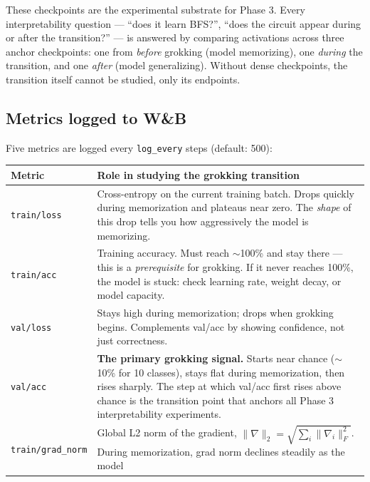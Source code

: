 \documentclass[11pt, a4paper]{article}
\begin{document}
These checkpoints are the experimental substrate for Phase 3. Every
interpretability question --- ``does it learn BFS?'', ``does the circuit appear
during or after the transition?'' --- is answered by comparing activations
across three anchor checkpoints: one from \emph{before} grokking (model
memorizing), one \emph{during} the transition, and one \emph{after} (model
generalizing). Without dense checkpoints, the transition itself cannot be
studied, only its endpoints.

\subsection{Metrics logged to W\&B}

Five metrics are logged every \texttt{log\_every} steps (default: 500):

\begin{table}[H]
\centering
\begin{tabular}{@{}lp{9cm}@{}}
\toprule
Metric & Role in studying the grokking transition \\
\midrule
\texttt{train/loss}      & Cross-entropy on the current training batch. Drops quickly
                           during memorization and plateaus near zero. The \emph{shape}
                           of this drop tells you how aggressively the model is memorizing. \\[4pt]
\texttt{train/acc}       & Training accuracy. Must reach $\sim$100\% and stay there ---
                           this is a \emph{prerequisite} for grokking. If it never reaches
                           100\%, the model is stuck: check learning rate, weight decay, or
                           model capacity. \\[4pt]
\texttt{val/loss}        & Stays high during memorization; drops when grokking begins.
                           Complements val/acc by showing confidence, not just correctness. \\[4pt]
\texttt{val/acc}         & \textbf{The primary grokking signal.} Starts near chance ($\sim$10\%
                           for 10 classes), stays flat during memorization, then rises sharply.
                           The step at which val/acc first rises above chance is the transition
                           point that anchors all Phase 3 interpretability experiments. \\[4pt]
\texttt{train/grad\_norm} & Global L2 norm of the gradient, $\|\nabla\|_2 = \sqrt{\sum_i \|\nabla_i\|_F^2}$.
                            During memorization, grad norm declines steadily as the model

\end{tabular}
\end{table}
\end{document}
